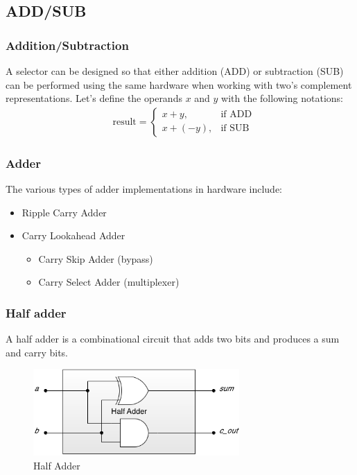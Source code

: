 \subsection{ADD/SUB}
\begin{frame}
    \frametitle{Addition/Subtraction}
    A selector can be designed so that either addition (ADD) or subtraction (SUB)
    can be performed using the same hardware when working with two's complement representations.
    Let's define the operands $x$ and $y$ with the following notations:
    \begin{equation}
        \begin{aligned}
            &\text{result} =
            \begin{cases}
                x + y, & \text{if ADD} \\
                x + (-y), & \text{if SUB}
            \end{cases}
        \end{aligned}
    \end{equation}
\end{frame}


\begin{frame}
    \frametitle{Adder}
    The various types of adder implementations in hardware include:
    \begin{itemize}
        \item Ripple Carry Adder
        \item Carry Lookahead Adder
            \begin{itemize}
                \item Carry Skip Adder (bypass)
                \item Carry Select Adder (multiplexer)
            \end{itemize}
    \end{itemize}
\end{frame}

\begin{frame}
    \frametitle{Half adder}
 A half adder is a combinational circuit that adds two bits and produces a sum and carry bits.
    \begin{figure}
        \centering
        \includegraphics[width=0.7\textwidth]{media/half-adder-gates.png}
        \caption{Half Adder}
    \end{figure}
\end{frame}

